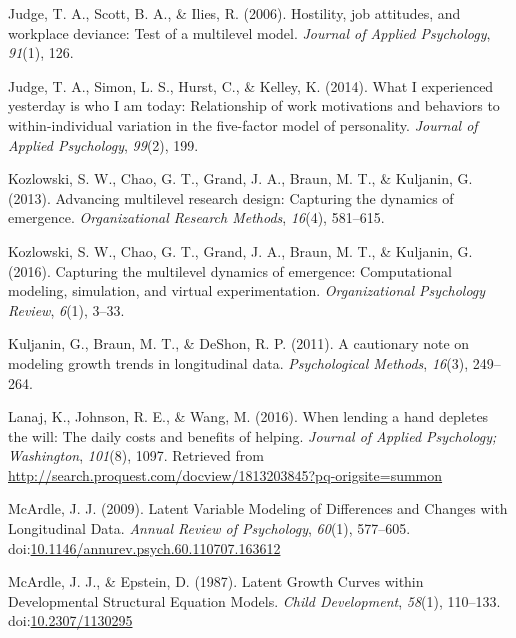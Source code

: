 \documentclass[english,,man]{apa6}
\begin{document}
\leavevmode\hypertarget{ref-judge2006hostility}{}%
Judge, T. A., Scott, B. A., \& Ilies, R. (2006). Hostility, job attitudes, and workplace deviance: Test of a multilevel model. \emph{Journal of Applied Psychology}, \emph{91}(1), 126.

\leavevmode\hypertarget{ref-judge_what_2014}{}%
Judge, T. A., Simon, L. S., Hurst, C., \& Kelley, K. (2014). What I experienced yesterday is who I am today: Relationship of work motivations and behaviors to within-individual variation in the five-factor model of personality. \emph{Journal of Applied Psychology}, \emph{99}(2), 199.

\leavevmode\hypertarget{ref-kozlowski_advancing_2013}{}%
Kozlowski, S. W., Chao, G. T., Grand, J. A., Braun, M. T., \& Kuljanin, G. (2013). Advancing multilevel research design: Capturing the dynamics of emergence. \emph{Organizational Research Methods}, \emph{16}(4), 581--615.

\leavevmode\hypertarget{ref-kozlowski_capturing_2016}{}%
Kozlowski, S. W., Chao, G. T., Grand, J. A., Braun, M. T., \& Kuljanin, G. (2016). Capturing the multilevel dynamics of emergence: Computational modeling, simulation, and virtual experimentation. \emph{Organizational Psychology Review}, \emph{6}(1), 3--33.

\leavevmode\hypertarget{ref-kuljanin2011cautionary}{}%
Kuljanin, G., Braun, M. T., \& DeShon, R. P. (2011). A cautionary note on modeling growth trends in longitudinal data. \emph{Psychological Methods}, \emph{16}(3), 249--264.

\leavevmode\hypertarget{ref-lanaj_when_2016}{}%
Lanaj, K., Johnson, R. E., \& Wang, M. (2016). When lending a hand depletes the will: The daily costs and benefits of helping. \emph{Journal of Applied Psychology; Washington}, \emph{101}(8), 1097. Retrieved from \url{http://search.proquest.com/docview/1813203845?pq-origsite=summon}

\leavevmode\hypertarget{ref-mcardle_latent_2009}{}%
McArdle, J. J. (2009). Latent Variable Modeling of Differences and Changes with Longitudinal Data. \emph{Annual Review of Psychology}, \emph{60}(1), 577--605. doi:\href{https://doi.org/10.1146/annurev.psych.60.110707.163612}{10.1146/annurev.psych.60.110707.163612}

\leavevmode\hypertarget{ref-mcardle_latent_1987}{}%
McArdle, J. J., \& Epstein, D. (1987). Latent Growth Curves within Developmental Structural Equation Models. \emph{Child Development}, \emph{58}(1), 110--133. doi:\href{https://doi.org/10.2307/1130295}{10.2307/1130295}
\end{document}
